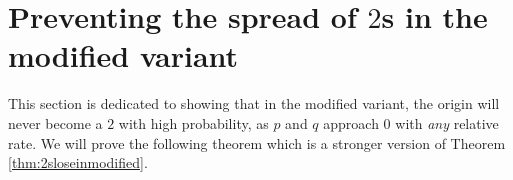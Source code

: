 \documentclass{article}
\newcommand{\bZ}{{\mathbb Z}}
\numberwithin{equation}{section}
\begin{document}
\section{Preventing the spread of $2$s in the modified variant}
\label{sec:preventspreadof2s}
  
 
    
    





This section is dedicated to showing that in the modified variant, the origin will never become a $2$ with high probability, as $p$ and $q$ approach $0$ with \textit{any} relative rate.
We will prove the following theorem which is a stronger version of Theorem \ref{thm:2sloseinmodified}.
\end{document}
